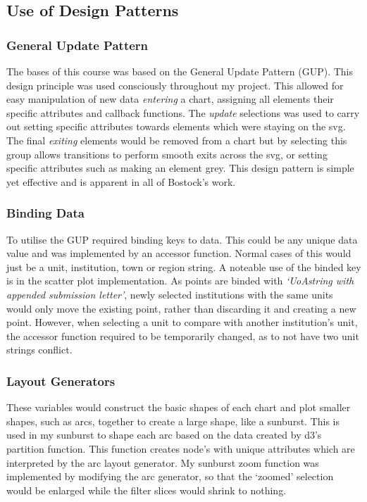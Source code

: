 \documentclass[a4paper, 11pt]{article}
\begin{document}
\newpage
\subsection{Use of Design Patterns}

\subsubsection{General Update Pattern}
The bases of this course was based on the General Update Pattern (GUP). This design principle was used consciously throughout my project. This allowed for easy manipulation of new data \textit{entering} a chart, assigning all elements their specific attributes and callback functions. The \textit{update} selections was used to carry out setting specific attributes towards elements which were staying on the svg. The final \textit{exiting} elements would be removed from a chart but by selecting this group allows transitions to perform smooth exits across the svg, or setting specific attributes such as making an element grey. This design pattern is simple yet effective and is apparent in all of Bostock's work.


\subsubsection{Binding Data}
To utilise the GUP required binding keys to data. This could be any unique data value and was implemented by an accessor function. Normal cases of this would just be a unit, institution, town or region string. A noteable use of the binded key is in the scatter plot implementation. As points are binded with \textit{`UoAstring with appended submission letter'}, newly selected institutions with the same units would only move the existing point, rather than discarding it and creating a new point. However, when selecting a unit to compare with another institution's unit, the accessor function required to be temporarily changed, as to not have two unit strings conflict.


\subsubsection{Layout Generators}
These variables would construct the basic shapes of each chart and plot smaller shapes, such as arcs, together to create a large shape, like a sunburst. This is used in my sunburst to shape each arc based on the data created by d3's partition function. This function creates node's with unique attributes which are interpreted by the arc layout generator. My sunburst zoom function was implemented by modifying the arc generator, so that the `zoomed' selection would be enlarged while the filter slices would shrink to nothing. 
\end{document}
